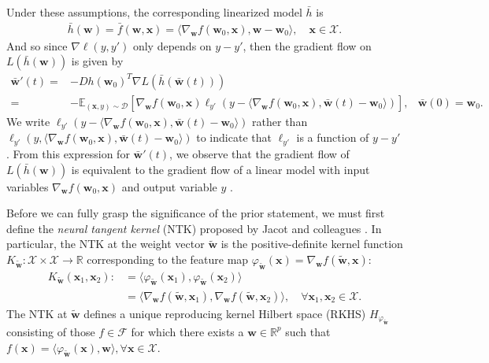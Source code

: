 \documentclass{article}
\begin{document}
Under these assumptions, the corresponding linearized model $\bar{h}$ is
\begin{align*}
    \bar{h}(\boldsymbol{w}) = \bar{f}(\boldsymbol{w}, \boldsymbol{x}) = \langle \nabla_{\boldsymbol{w}} f(\boldsymbol{w}_0, \boldsymbol{x}), \boldsymbol{w}-\boldsymbol{w}_0\rangle, \quad \boldsymbol{x} \in \mathcal{X}. 
\end{align*}
And so since $\nabla \ell(y, y')$ only depends on $y - y'$, then the gradient flow on $L(\bar{h}(\boldsymbol{w}))$ is given by
\begin{align*}
    \boldsymbol{\bar{w}}'(t) =& - Dh(\boldsymbol{w}_0)^T \nabla L(\bar{h}(\boldsymbol{\bar{w}}(t)))\\
    =& -\mathbb{E}_{(\boldsymbol{x}, y) \sim \mathcal{D}} \left[ \nabla_{\boldsymbol{w}}f(\boldsymbol{w}_0, \boldsymbol{x}) \ell_{y'}(y - \langle \nabla_{\boldsymbol{w}} f(\boldsymbol{w}_0, \boldsymbol{x}), \boldsymbol{\bar{w}}(t)-\boldsymbol{w}_0\rangle) \right],
    & \boldsymbol{\bar{w}}(0) = \boldsymbol{w}_0.
\end{align*}
We write $\ell_{y'}(y - \langle \nabla_{\boldsymbol{w}} f(\boldsymbol{w}_0, \boldsymbol{x}), \boldsymbol{\bar{w}}(t)-\boldsymbol{w}_0\rangle)$ rather than $\ell_{y'}(y, \langle \nabla_{\boldsymbol{w}} f(\boldsymbol{w}_0, \boldsymbol{x}), \boldsymbol{\bar{w}}(t)-\boldsymbol{w}_0\rangle)$ to indicate that $\ell_{y'}$ is a function of $y - y'$. From this expression for $\boldsymbol{\bar{w}}'(t)$, we observe that the gradient flow of $L(\bar{h}(\boldsymbol{w}))$ is equivalent to the gradient flow of a linear model with input variables $\nabla_{\boldsymbol{w}} f(\boldsymbol{w}_0, \boldsymbol{x})$ and output variable $y$ \cite{chizat2018note}. 

Before we can fully grasp the significance of the prior statement, we must first define the \textit{neural tangent kernel} (NTK) proposed by Jacot and colleagues \cite{jacot2018neural}. In particular, the NTK at the weight vector $\boldsymbol{\tilde{w}}$ is the positive-definite kernel function $K_{\boldsymbol{\tilde{w}}}: \mathcal{X} \times \mathcal{X} \rightarrow \mathbb{R}$ corresponding to the feature map $\varphi_{\boldsymbol{\tilde{w}}}(\boldsymbol{x}) = \nabla_{\boldsymbol{w}} f(\boldsymbol{\tilde{w}}, \boldsymbol{x})$:
\begin{align}
    K_{\boldsymbol{\tilde{w}}}(\boldsymbol{x}_1, \boldsymbol{x}_2) :&= \langle \varphi_{\boldsymbol{\tilde{w}}}(\boldsymbol{x}_1), \varphi_{\boldsymbol{\tilde{w}}}(\boldsymbol{x}_2) \rangle \nonumber \\
    &= \langle \nabla_{\boldsymbol{w}} f(\boldsymbol{\tilde{w}}, \boldsymbol{x}_1), \nabla_{\boldsymbol{w}} f(\boldsymbol{\tilde{w}}, \boldsymbol{x}_2) \rangle, \quad \forall \boldsymbol{x}_1, \boldsymbol{x}_2 \in \mathcal{X}\label{NTK}.
\end{align}
The NTK at $\boldsymbol{\tilde{w}}$ defines a unique reproducing kernel Hilbert space (RKHS) $H_{\varphi_{\boldsymbol{\tilde{w}}}}$ consisting of those $f \in \mathcal{F}$ for which there exists a $\boldsymbol{w} \in \mathbb{R}^p$ such that $f(\boldsymbol{x}) = \langle \varphi_{\boldsymbol{\tilde{w}}}(\boldsymbol{x}), \boldsymbol{w} \rangle, \forall \boldsymbol{x} \in \mathcal{X}$.  
\end{document}
